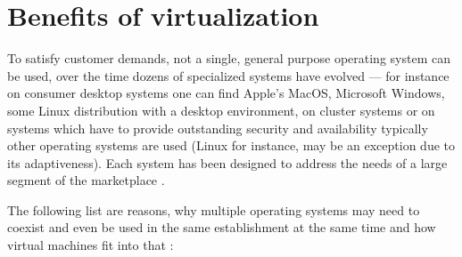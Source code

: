 \section{Benefits of virtualization}
\label{sec:benefits}

To  satisfy customer  demands,  not a  single,  general purpose  operating
system  can be  used, over  the time  dozens of  specialized  systems have
evolved --- for instance on  consumer desktop systems one can find Apple's
MacOS,  Microsoft   Windows,  some  Linux  distribution   with  a  desktop
environment,  on cluster  systems  or  on systems  which  have to  provide
outstanding  security and availability  typically other  operating systems
are  used   (Linux  for  instance,  may   be  an  exception   due  to  its
adaptiveness).  Each  system has been designed  to address the  needs of a
large segment of the marketplace \cite{borden89}.

\bigskip

The following list are reasons, why multiple operating systems may need to
coexist and  even be used in the  same establishment at the  same time and
how virtual machines fit into that \cite{borden89,virtualization-overview}:

